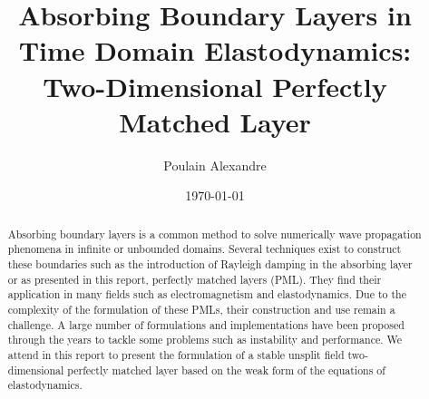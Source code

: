 \documentclass[11pt]{article}
\title{Absorbing Boundary Layers in Time Domain Elastodynamics: Two-Dimensional Perfectly Matched Layer}
\author{Poulain Alexandre}
\date{\today}
\begin{document}
\pagestyle{empty}


\newpage
\renewcommand{\abstractname}{Abstract}
\begin{abstract}
Absorbing boundary layers is a common method to solve numerically wave propagation phenomena in infinite or unbounded domains. Several techniques exist to construct these boundaries such as the introduction of Rayleigh damping in the absorbing layer or as presented in this report, perfectly matched layers (PML). They find their application in many fields such as electromagnetism and elastodynamics.   
Due to the complexity of the formulation of these PMLs, their construction and use remain a challenge. A large number of formulations and implementations have been proposed through the years to tackle some problems such as instability and performance.  
We attend in this report to present the formulation of a stable unsplit field two-dimensional perfectly matched layer based on the weak form of the equations of elastodynamics. 


\end{abstract}
\end{document}
